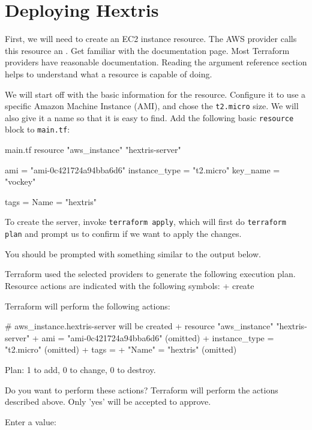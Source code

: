 \documentclass{csse4400}
\begin{document}
\section{Deploying Hextris}
First, we will need to create an EC2 instance resource.
The AWS provider calls this resource an .
Get familiar with the documentation page.
Most Terraform providers have reasonable documentation.
Reading the argument reference section helps to understand what a resource is capable of doing.

We will start off with the basic information for the resource.
Configure it to use a specific Amazon Machine Instance (AMI), and chose the \texttt{t2.micro} size.
We will also give it a name so that it is easy to find.
Add the following basic \texttt{resource} block to \texttt{main.tf}:

\begin{code}[language=terraform,numbers=none]{main.tf}
resource "aws_instance" "hextris-server" {
    ami           = "ami-0c421724a94bba6d6"
    instance_type = "t2.micro"
    key_name      = "vockey"
    
    tags = {
        Name = "hextris"
    }
}
\end{code}

To create the server, invoke \texttt{terraform apply},
which will first do \texttt{terraform plan} and prompt us to confirm if we want to apply the changes.


You should be prompted with something similar to the output below.

\begin{code}[numbers=none]{}
Terraform used the selected providers to generate the following execution plan. Resource actions are indicated with the following symbols:
  + create

Terraform will perform the following actions:

  # aws_instance.hextris-server will be created
  + resource "aws_instance" "hextris-server" {
      + ami                                  = "ami-0c421724a94bba6d6"
      (omitted)
      + instance_type                        = "t2.micro"
      (omitted)
      + tags                                 = {
          + "Name" = "hextris"
        }
      (omitted)
    }

Plan: 1 to add, 0 to change, 0 to destroy.

Do you want to perform these actions?
  Terraform will perform the actions described above.
  Only 'yes' will be accepted to approve.

  Enter a value: 
\end{code}
\end{document}
